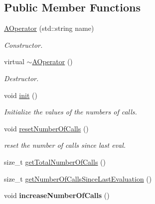 \subsection*{Public Member Functions}
\begin{DoxyCompactItemize}
\item 
\hypertarget{classAOperator_afaaaafa72f7c09e64ecffd2ae83f6c29}{\hyperlink{classAOperator_afaaaafa72f7c09e64ecffd2ae83f6c29}{A\-Operator} (std\-::string name)}\label{classAOperator_afaaaafa72f7c09e64ecffd2ae83f6c29}

\begin{DoxyCompactList}\small\item\em Constructor. \end{DoxyCompactList}\item 
\hypertarget{classAOperator_a7854b2edbcad8022e3965076d5909f0e}{virtual \hyperlink{classAOperator_a7854b2edbcad8022e3965076d5909f0e}{$\sim$\-A\-Operator} ()}\label{classAOperator_a7854b2edbcad8022e3965076d5909f0e}

\begin{DoxyCompactList}\small\item\em Destructor. \end{DoxyCompactList}\item 
\hypertarget{classAOperator_aef1d7317fac50612783941a9ed4bdd55}{void \hyperlink{classAOperator_aef1d7317fac50612783941a9ed4bdd55}{init} ()}\label{classAOperator_aef1d7317fac50612783941a9ed4bdd55}

\begin{DoxyCompactList}\small\item\em Initialize the values of the numbers of calls. \end{DoxyCompactList}\item 
\hypertarget{classAOperator_a5e43e03617a73fc21764e8913cdbb023}{void \hyperlink{classAOperator_a5e43e03617a73fc21764e8913cdbb023}{reset\-Number\-Of\-Calls} ()}\label{classAOperator_a5e43e03617a73fc21764e8913cdbb023}

\begin{DoxyCompactList}\small\item\em reset the number of calls since last eval. \end{DoxyCompactList}\item 
size\-\_\-t \hyperlink{classAOperator_a53e8afe10d5ab0f717e0ee1771ac1e4e}{get\-Total\-Number\-Of\-Calls} ()
\item 
size\-\_\-t \hyperlink{classAOperator_aae3aa0fc70bbc10a61057d12856fd4a8}{get\-Number\-Of\-Calls\-Since\-Last\-Evaluation} ()
\item 
\hypertarget{classAOperator_a2d63ac666c67ec37a53e7098ecbbf2b2}{void {\bfseries increase\-Number\-Of\-Calls} ()}\label{classAOperator_a2d63ac666c67ec37a53e7098ecbbf2b2}


\end{DoxyCompactItemize}
